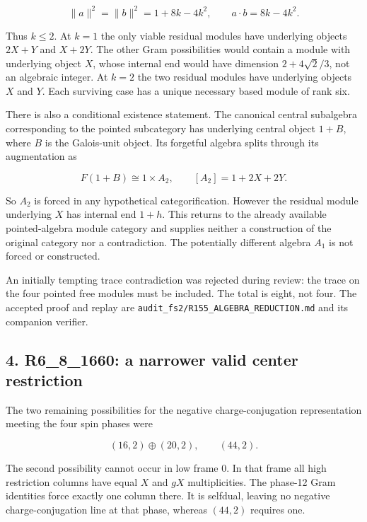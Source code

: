 \documentclass[
  11pt,
]{article}
\begin{document}
\[
\|a\|^2=\|b\|^2=1+8k-4k^2,\qquad a\cdot b=8k-4k^2.
\]

Thus \(k\le2\). At \(k=1\) the only viable residual modules have
underlying objects \(2X+Y\) and \(X+2Y\). The other Gram possibilities
would contain a module with underlying object \(X\), whose internal end
would have dimension \(2+4\sqrt2/3\), not an algebraic integer. At
\(k=2\) the two residual modules have underlying objects \(X\) and
\(Y\). Each surviving case has a unique necessary based module of rank
six.

There is also a conditional existence statement. The canonical central
subalgebra corresponding to the pointed subcategory has underlying
central object \(1+B\), where \(B\) is the Galois-unit object. Its
forgetful algebra splits through its augmentation as

\[
F(1+B)\cong1\times A_2,\qquad [A_2]=1+2X+2Y.
\]

So \(A_2\) is forced in any hypothetical categorification. However the
residual module underlying \(X\) has internal end \(1+h\). This returns
to the already available pointed-algebra module category and supplies
neither a construction of the original category nor a contradiction. The
potentially different algebra \(A_1\) is not forced or constructed.

An initially tempting trace contradiction was rejected during review:
the trace on the four pointed free modules must be included. The total
is eight, not four. The accepted proof and replay are
\texttt{audit\_fs2/R155\_ALGEBRA\_REDUCTION.md} and its companion
verifier.

\hypertarget{r6_8_1660-a-narrower-valid-center-restriction}{%
\subsection{4. R6\_8\_1660: a narrower valid center
restriction}\label{r6_8_1660-a-narrower-valid-center-restriction}}

The two remaining possibilities for the negative charge-conjugation
representation meeting the four spin phases were

\[
(16,2)\oplus(20,2),\qquad (44,2).
\]

The second possibility cannot occur in low frame 0. In that frame all
high restriction columns have equal \(X\) and \(gX\) multiplicities. The
phase-12 Gram identities force exactly one column there. It is selfdual,
leaving no negative charge-conjugation line at that phase, whereas
\((44,2)\) requires one.
\end{document}
